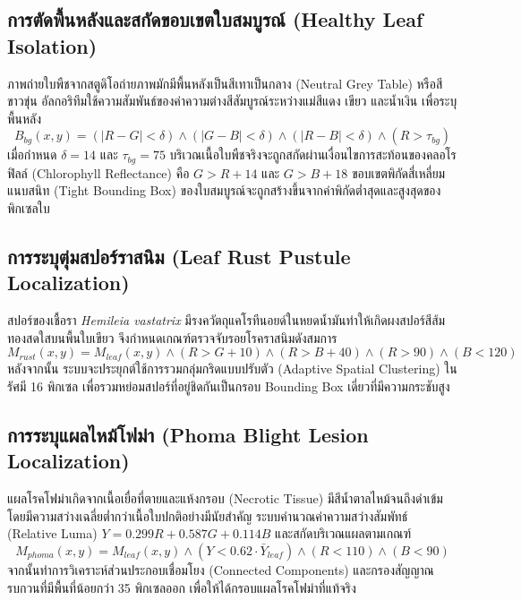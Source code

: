 \subsection{การตัดพื้นหลังและสกัดขอบเขตใบสมบูรณ์ (Healthy Leaf Isolation)}
ภาพถ่ายใบพืชจากสตูดิโอถ่ายภาพมักมีพื้นหลังเป็นสีเทาเป็นกลาง (Neutral Grey Table) หรือสีขาวขุ่น อัลกอริทึมใช้ความสัมพันธ์ของค่าความต่างสีสัมบูรณ์ระหว่างแม่สีแดง เขียว และน้ำเงิน เพื่อระบุพื้นหลัง
\begin{equation}
    B_{bg}(x, y) = (|R - G| < \delta) \land (|G - B| < \delta) \land (|R - B| < \delta) \land (R > \tau_{bg})
\end{equation}
\noindent เมื่อกำหนด $\delta = 14$ และ $\tau_{bg} = 75$ บริเวณเนื้อใบพืชจริงจะถูกสกัดผ่านเงื่อนไขการสะท้อนของคลอโรฟิลล์ (Chlorophyll Reflectance) คือ $G > R + 14$ และ $G > B + 18$ ขอบเขตพิกัดสี่เหลี่ยมแนบสนิท (Tight Bounding Box) ของใบสมบูรณ์จะถูกสร้างขึ้นจากค่าพิกัดต่ำสุดและสูงสุดของพิกเซลใบ

\subsection{การระบุตุ่มสปอร์ราสนิม (Leaf Rust Pustule Localization)}
สปอร์ของเชื้อรา \textit{Hemileia vastatrix} มีรงควัตถุแคโรทีนอยด์ในหยดน้ำมันทำให้เกิดผงสปอร์สีส้มทองสดใสบนพื้นใบเขียว จึงกำหนดเกณฑ์ตรวจจับรอยโรคราสนิมดังสมการ
\begin{equation}
    M_{rust}(x, y) = M_{leaf}(x, y) \land (R > G + 10) \land (R > B + 40) \land (R > 90) \land (B < 120)
\end{equation}
\noindent หลังจากนั้น ระบบจะประยุกต์ใช้การรวมกลุ่มกริดแบบปรับตัว (Adaptive Spatial Clustering) ในรัศมี 16 พิกเซล เพื่อรวมหย่อมสปอร์ที่อยู่ชิดกันเป็นกรอบ Bounding Box เดี่ยวที่มีความกระชับสูง

\subsection{การระบุแผลไหม้โฟม่า (Phoma Blight Lesion Localization)}
แผลโรคโฟม่าเกิดจากเนื้อเยื่อที่ตายและแห้งกรอบ (Necrotic Tissue) มีสีน้ำตาลไหม้จนถึงดำเข้ม โดยมีความสว่างเฉลี่ยต่ำกว่าเนื้อใบปกติอย่างมีนัยสำคัญ ระบบคำนวณค่าความสว่างสัมพัทธ์ (Relative Luma) $Y = 0.299R + 0.587G + 0.114B$ และสกัดบริเวณแผลตามเกณฑ์
\begin{equation}
    M_{phoma}(x, y) = M_{leaf}(x, y) \land (Y < 0.62 \cdot \bar{Y}_{leaf}) \land (R < 110) \land (B < 90)
\end{equation}
\noindent จากนั้นทำการวิเคราะห์ส่วนประกอบเชื่อมโยง (Connected Components) และกรองสัญญาณรบกวนที่มีพื้นที่น้อยกว่า 35 พิกเซลออก เพื่อให้ได้กรอบแผลโรคโฟม่าที่แท้จริง


